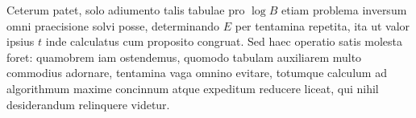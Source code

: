 Ceterum patet, solo adiumento talis tabulae pro $\log B$ etiam problema inversum omni praecisione solvi posse, determinando $E$ per tentamina repetita, ita ut valor ipsius $t$ inde calculatus cum proposito congruat. Sed haec operatio satis molesta foret: quamobrem iam ostendemus, quomodo tabulam auxiliarem multo commodius adornare, tentamina vaga omnino evitare, totumque calculum ad algorithmum maxime concinnum atque expeditum reducere liceat, qui nihil desiderandum relinquere videtur.
